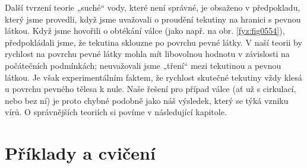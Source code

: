     Další tvrzení teorie „suché“ vody, které není správné, je obsaženo v předpokladu, který jsme 
    provedli, když jsme uvažovali o proudění tekutiny na hranici s pevnou látkou. Když jsme 
    hovořili o obtékání válce (jako např. na obr. \ref{fyz:fig0554}), předpokládali jsme, že 
    tekutina sklouzne po povrchu pevné látky. V naší teorii by rychlost na povrchu pevné látky 
    mohla mít libovolnou hodnotu v závislosti na počátečních podmínkách; neuvažovali jsme „tření“ 
    mezi tekutinou a pevnou látkou. Je však experimentálním faktem, že rychlost skutečné tekutiny 
    vždy klesá u povrchu pevného tělesa k nule. Naše řešení pro případ válce (ať už s cirkulací, 
    nebo bez ní) je proto chybné podobně jako náš výsledek, který se týká vzniku vírů. O 
    správnějších teoriích si povíme v následující kapitole.
    
  \section{Příklady a cvičení}\label{fyz:IIchapXLsecVI}
    
